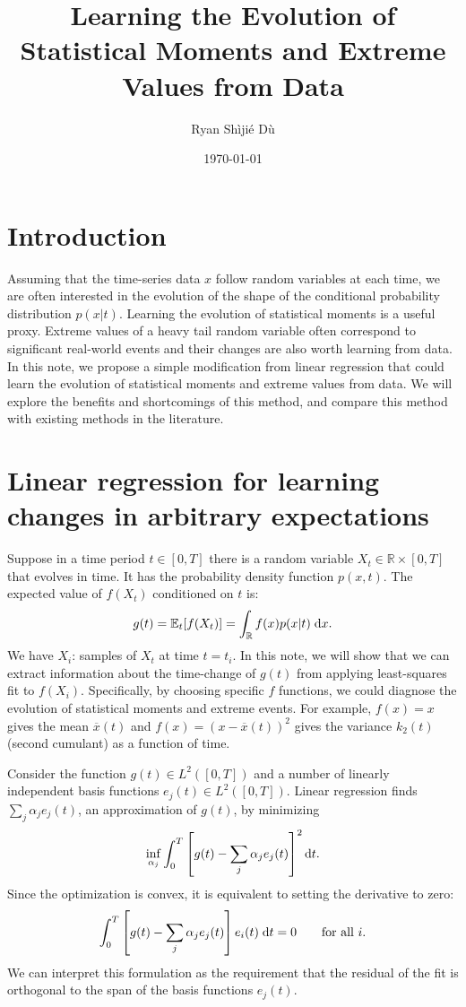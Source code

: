 \documentclass[11pt,letterpaper]{article}
\title{Learning the Evolution of Statistical Moments and Extreme Values from Data}
\author{Ryan Sh\`iji\'e D\`u}
\date{\today}
\begin{document}

\maketitle

\section{Introduction}
Assuming that the time-series data $x$ follow random variables at each time, we are often interested in the evolution of the shape of the conditional probability distribution $p(x|t)$. Learning the evolution of statistical moments is a useful proxy. Extreme values of a heavy tail random variable often correspond to significant real-world events and their changes are also worth learning from data. In this note, we propose a simple modification from linear regression that could learn the evolution of statistical moments and extreme values from data. We will explore the benefits and shortcomings of this method, and compare this method with existing methods in the literature.

\section{Linear regression for learning changes in arbitrary expectations}
Suppose in a time period $t\in [0,T]$ there is a random variable $X_t\in\mathbb{R}\times[0,T]$ that evolves in time. It has the probability density function $p(x,t)$. The expected value of $f(X_t)$ conditioned on $t$ is:
\begin{align}
    g(t) = \mathbb{E}_t[f(X_t)] = \int_\mathbb{R} f(x)p(x|t)\;\mathrm{d} x.\label{eq:expectation_fg}
\end{align}
We have $X_i$: samples of $X_t$ at time $t = t_i$. In this note, we will show that we can extract information about the time-change of $g(t)$ from applying least-squares fit to $f(X_i)$. Specifically, by choosing specific $f$ functions, we could diagnose the evolution of statistical moments and extreme events. For example, $f(x) = x$ gives the mean $\overline{x}(t)$ and $f(x) = (x-\overline{x}(t))^2$ gives the variance $k_2(t)$ (second cumulant) as a function of time. 

Consider the function $g(t)\in L^2([0,T])$ and a number of linearly independent basis functions $e_j(t)\in L^2([0,T])$. Linear regression finds $\sum_j\alpha_j e_j(t)$, an approximation of $g(t)$, by minimizing
\begin{align}
    \inf_{\alpha_j} \int_0^T \left[ g(t)-\sum_j\alpha_je_j(t) \right]^2\mathrm{d} t.
\end{align}
Since the optimization is convex, it is equivalent to setting the derivative to zero:
\begin{align}
    \int_0^T \left[ g(t)-\sum_j\alpha_je_j(t) \right]e_i(t)\;\mathrm{d} t = 0\label{eq:leastsq_proj}\quad \mbox{} \quad \text{for all $i$.}
\end{align}
We can interpret this formulation as the requirement that the residual of the fit is orthogonal to the span of the basis functions $e_j(t)$. 
\end{document}
